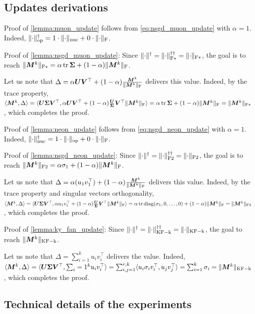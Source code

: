 \documentclass{article} %
\newcommand{\norm}[1]{\lVert #1\rVert}
\DeclarePairedDelimiter{\normf}{\|}{\|_\mathrm{F}}
\DeclarePairedDelimiter{\normkfk}{\|}{\|_\mathrm{KF-k}}
\DeclarePairedDelimiter{\normfstar}{\|}{\|_\mathrm{F*}}
\DeclarePairedDelimiter{\normftwo}{\|}{\|_\mathrm{F2}}
\DeclarePairedDelimiter{\norms}{\|}{\|_{\mathrm{op}}}
\DeclarePairedDelimiter{\normn}{\|}{\|_{\mathrm{nuc}}}
\def\<#1,#2>{\langle #1,#2\rangle}
\DeclareMathOperator{\tr}{tr}
\DeclareMathOperator{\diag}{diag}
\begin{document}
\subsection{Updates derivations}

Proof of \cref{lemma:muon_update} follows from \cref{eq:nsgd_muon_update} with $\alpha=1$. Indeed, $\norms{\cdot}^\dagger=1\cdot\normn{\cdot} + 0 \cdot \normf{\cdot} $.

Proof of \cref{lemma:nsgd_muon_update}:
Since $\norm{\cdot}^\dagger = \normfstar{\cdot}^{\dagger\dagger} = \normfstar{\cdot}$, the goal is to reach $\normfstar{\mM^k} = \alpha \tr{\mSigma} + (1-\alpha) \normf{\mM^k}$.

Let us note that $\Delta = \alpha \mU \mV^\top + (1-\alpha) \frac{\mM^k}{\normf{\mM^k}}$ delivers this value. Indeed, by the trace property, $\<\mM^k, \Delta> =\<\mU \mSigma \mV^\top, \alpha \mU \mV^\top + (1-\alpha) \frac{\mU \mSigma \mV^\top}{\normf{\mM^k}}> = \alpha \tr \mSigma + (1-\alpha) \normf{\mM^k} = \normfstar{\mM^k}$, which completes the proof.

Proof of \cref{lemma:neon_update} follows from \cref{eq:nsgd_neon_update} with $\alpha=1$. Indeed, $\normn{\cdot}^\dagger=1\cdot\norms{\cdot} + 0 \cdot \normf{\cdot} $.

Proof of \cref{lemma:nsgd_neon_update}:
Since $\norm{\cdot}^\dagger = \normftwo{\cdot}^{\dagger\dagger} = \normftwo{\cdot}$, the goal is to reach $\normftwo{\mM^k} = \alpha \sigma_1 + (1-\alpha) \normf{\mM^k}$.

Let us note that $\Delta = \alpha (u_1 v_1^\top) + (1-\alpha) \frac{\mM^k}{\normf{\mM^k}}$ delivers this value. Indeed, by the trace property and singular vectors orthogonality, $\<\mM^k, \Delta> =\<\mU \mSigma \mV^\top, \alpha u_1 v_1^\top + (1-\alpha) \frac{\mU \mSigma \mV^\top}{\normf{\mM^k}}> = \alpha \tr \diag({\sigma_1, 0, \dots, 0}) + (1-\alpha) \normf{\mM^k} = \normftwo{\mM^k}$, which completes the proof.


Proof of \cref{lemma:ky_fan_update}:
Since $\norm{\cdot}^\dagger = \normkfk{\cdot}^{\dagger\dagger} = \normkfk{\cdot}$, the goal to reach $\normkfk{\mM^k}$.

Let us note that $\Delta = \sum_{i=1}^{k} u_i v_i^\top$ delivers the value. Indeed, $\<\mM^k, \Delta> =\<\mU \mSigma \mV^\top, \sum_{i=1}^{k} u_i v_i^\top> = \sum_{i,j=1}^{r, k}\<u_i \sigma_i v_i^\top, u_j v_j^\top> = \sum_{i=1}^{k}\sigma_i = \normkfk{\mM^k}$, which completes the proof. 

\subsection{Technical details of the experiments}
\end{document}
